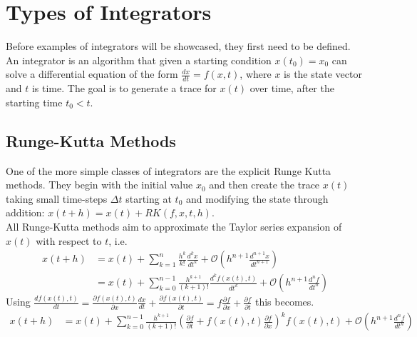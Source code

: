 \section{Types of Integrators}
Before examples of integrators will be showcased, they first need to be defined.
An integrator is an algorithm that given a starting condition $x(t_0) = x_0$ can solve a differential equation of the form $\frac{dx}{dt} = f(x,t)$, where $x$ is the state vector and $t$ is time.
The goal is to generate a trace for $x(t)$ over time, after the starting time $t_0<t$.

\subsection{Runge-Kutta Methods}
One of the more simple classes of integrators are the explicit Runge Kutta methods.
They begin with the initial value $x_0$ and then create the trace $x(t)$ taking small time-steps $\Delta t$ starting at $t_0$ and modifying the state through addition: $x(t+h) = x(t) + RK(f,x,t,h)$.\\
All Runge-Kutta methods aim to approximate the Taylor series expansion of $x(t)$ with respect to $t$, i.e.
\begin{align*}
x(t+h) &= x(t) + \sum_{k=1}^{n}\frac{h^k}{k!}\frac{d^kx}{dt^k} + \mathcal{O} (h^{n+1}\frac{d^{n+1}x}{dt^{n+1}})\\
&= x(t)+ \sum_{k=0}^{n-1}\frac{h^{k+1}}{(k+1)!}\frac{d^kf(x(t),t)}{dt^k} + \mathcal{O}(h^{n+1}\frac{d^{n}f}{dt^{n}})
\end{align*}
Using $\frac{df(x(t),t)}{dt} 
= \frac{\partial f(x(t),t)}{\partial x}\frac{dx}{dt}+\frac{\partial f(x(t),t)}{\partial t} 
= f\frac{\partial f}{\partial x}+\frac{\partial f}{\partial t}$
this becomes.
\begin{align*}
x(t+h) &= x(t)+ \sum_{k=0}^{n-1}\frac{h^{k+1}}{(k+1)!}(\frac{\partial f}{\partial t} + f(x(t),t)\frac{\partial f}{\partial x})^kf(x(t),t) + \mathcal{O}(h^{n+1}\frac{d^{n}f}{dt^{n}})
\end{align*}


